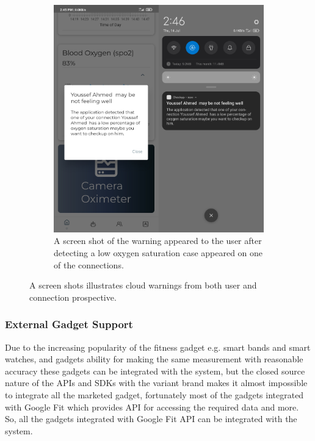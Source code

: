 \documentclass{bmcart}
\begin{document}
\begin{figure}[h!]
\begin{subfigure}{0.45\textwidth}
    \includegraphics[width=\linewidth]{png_images/connection_warning.png}
  \caption{
  A screen shot of the warning appeared to the user after detecting a low oxygen
  saturation case appeared on one of the connections.}
    \end{subfigure}
    \caption{
    A screen shots illustrates cloud warnings from both user and connection
    prospective.}
    \end{figure}
\FloatBarrier

\subsubsection*{External Gadget Support}
Due to the increasing popularity of the fitness gadget e.g. smart bands and
smart watches, and gadgets ability for making the same measurement with
reasonable accuracy these gadgets can be integrated with the system, but the
closed source nature of the APIs and SDKs with the variant  brand makes it
almost impossible to integrate all the marketed gadget, fortunately most of the
gadgets integrated with Google Fit which provides API for accessing the required
data and more. So, all the gadgets integrated with Google Fit API can be
integrated with the system.
\end{document}
